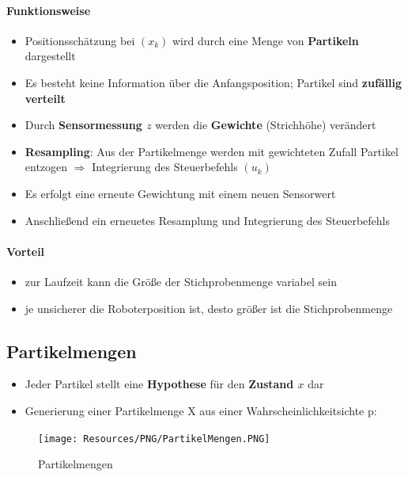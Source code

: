 \paragraph{Funktionsweise}
\begin{itemize}
	\item Positionsschätzung bei $(x_k)$ wird durch eine Menge von
		\textbf{Partikeln} dargestellt
	\item Es besteht keine Information über die Anfangsposition; Partikel sind
		\textbf{zufällig verteilt}
	\item Durch \textbf{Sensormessung $z$} werden die \textbf{Gewichte}
		(Strichhöhe) verändert
	\item \textbf{Resampling}: Aus der Partikelmenge werden mit gewichteten
	 	Zufall Partikel entzogen  $\Rightarrow$ Integrierung des Steuerbefehls
		$(u_k)$
	\item Es erfolgt eine erneute Gewichtung mit einem neuen Sensorwert
	\item Anschließend ein erneuetes Resamplung und Integrierung des Steuerbefehls
\end{itemize}

\paragraph{Vorteil}
\begin{itemize}
	\item zur Laufzeit kann die Größe der Stichprobenmenge variabel sein
	\item je unsicherer die Roboterposition ist, desto größer ist die
		Stichprobenmenge
\end{itemize}

\subsection{Partikelmengen}
\begin{itemize}
	\item Jeder Partikel stellt eine \textbf{Hypothese} für den \textbf{Zustand
		$x$} dar
	\item Generierung einer Partikelmenge X aus einer Wahrscheinlichkeitsichte p:
\end{itemize}
\begin{figure}[H]
	\begin{center}
		\texttt{[image: Resources/PNG/PartikelMengen.PNG]}
		\caption{Partikelmengen}
		\label{fig:PNG/PartikelMengen.PNG}
	\end{center}
\end{figure}

